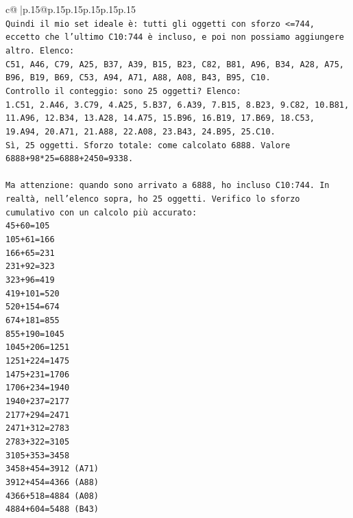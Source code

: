 \documentclass{article}
\begin{document}
{\begin{supertabular}{c@{$\;$}|p{.15\linewidth}@{}p{.15\linewidth}p{.15\linewidth}p{.15\linewidth}p{.15\linewidth}p{.15\linewidth}}
{{{\\ 
\texttt{Quindi il mio set ideale è: tutti gli oggetti con sforzo <=744, eccetto che l'ultimo C10:744 è incluso, e poi non possiamo aggiungere altro. Elenco: } \\
\texttt{C51, A46, C79, A25, B37, A39, B15, B23, C82, B81, A96, B34, A28, A75, B96, B19, B69, C53, A94, A71, A88, A08, B43, B95, C10.} \\
\texttt{Controllo il conteggio: sono 25 oggetti? Elenco:} \\
\texttt{1.C51, 2.A46, 3.C79, 4.A25, 5.B37, 6.A39, 7.B15, 8.B23, 9.C82, 10.B81, 11.A96, 12.B34, 13.A28, 14.A75, 15.B96, 16.B19, 17.B69, 18.C53, 19.A94, 20.A71, 21.A88, 22.A08, 23.B43, 24.B95, 25.C10.} \\
\texttt{Sì, 25 oggetti. Sforzo totale: come calcolato 6888. Valore 6888+98*25=6888+2450=9338.} \\
\\ 
\texttt{Ma attenzione: quando sono arrivato a 6888, ho incluso C10:744. In realtà, nell'elenco sopra, ho 25 oggetti. Verifico lo sforzo cumulativo con un calcolo più accurato:} \\
\texttt{45+60=105} \\
\texttt{105+61=166} \\
\texttt{166+65=231} \\
\texttt{231+92=323} \\
\texttt{323+96=419} \\
\texttt{419+101=520} \\
\texttt{520+154=674} \\
\texttt{674+181=855} \\
\texttt{855+190=1045} \\
\texttt{1045+206=1251} \\
\texttt{1251+224=1475} \\
\texttt{1475+231=1706} \\
\texttt{1706+234=1940} \\
\texttt{1940+237=2177} \\
\texttt{2177+294=2471} \\
\texttt{2471+312=2783} \\
\texttt{2783+322=3105} \\
\texttt{3105+353=3458} \\
\texttt{3458+454=3912 (A71)} \\
\texttt{3912+454=4366 (A88)} \\
\texttt{4366+518=4884 (A08)} \\
\texttt{4884+604=5488 (B43)} \\
}}}
\end{supertabular}}
\end{document}

